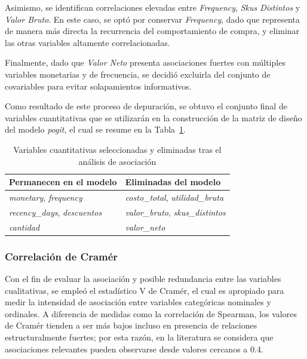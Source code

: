        Asimismo, se identifican correlaciones elevadas entre \textit{Frequency}, \textit{Skus Distintos} y \textit{Valor Bruto}. En este caso, se optó por conservar \textit{Frequency}, dado que representa de manera más directa la recurrencia del comportamiento de compra, y eliminar las otras variables altamente correlacionadas.
        
        Finalmente, dado que \textit{Valor Neto} presenta asociaciones fuertes con múltiples variables monetarias y de frecuencia, se decidió excluirla del conjunto de covariables para evitar solapamientos informativos.
        
        Como resultado de este proceso de depuración, se obtuvo el conjunto final de variables cuantitativas que se utilizarán en la construcción de la matriz de diseño del modelo \emph{pogit}, el cual se resume en la Tabla~\ref{tab:depuracion_cuantitativas}.
        
        \begin{table}[H]
        \centering
        \caption{Variables cuantitativas seleccionadas y eliminadas tras el análisis de asociación}
        \label{tab:depuracion_cuantitativas}
        \renewcommand{\arraystretch}{1.2}
        \begin{tabular}{p{7cm} p{7cm}}
        \hline
        \textbf{Permanecen en el modelo} & \textbf{Eliminadas del modelo} \\
        \hline
        \textit{monetary}, \textit{frequency} 
        & \textit{costo\_total}, \textit{utilidad\_bruta} \\
        \textit{recency\_days}, \textit{descuentos} 
        & \textit{valor\_bruto}, \textit{skus\_distintos} \\
        \textit{cantidad} 
        & \textit{valor\_neto} \\
        \hline
        \end{tabular}
        \end{table}

\subsubsection{Correlación de Cramér}
        Con el fin de evaluar la asociación y posible redundancia entre las variables cualitativas, se empleó el estadístico V de Cramér, el cual es apropiado para medir la intensidad de asociación entre variables categóricas nominales y ordinales. A diferencia de medidas como la correlación de Spearman, los valores de Cramér tienden a ser más bajos incluso en presencia de relaciones estructuralmente fuertes; por esta razón, en la literatura se considera que asociaciones relevantes pueden observarse desde valores cercanos a 0.4.  
        
